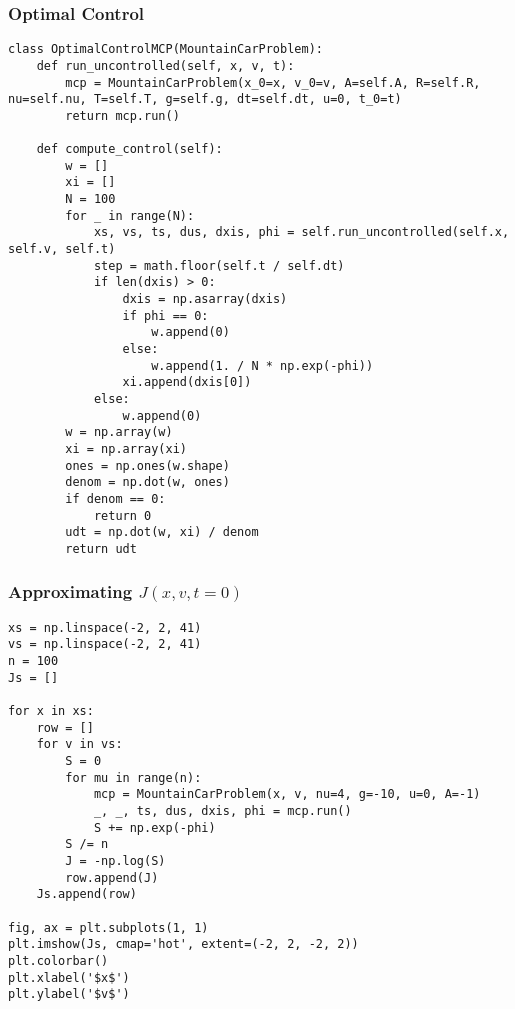 \documentclass[10pt,a4paper]{article}
\begin{document}
\subsubsection{Optimal Control}
\begin{lstlisting}
class OptimalControlMCP(MountainCarProblem):
    def run_uncontrolled(self, x, v, t):
        mcp = MountainCarProblem(x_0=x, v_0=v, A=self.A, R=self.R, nu=self.nu, T=self.T, g=self.g, dt=self.dt, u=0, t_0=t)
        return mcp.run()
    
    def compute_control(self):
        w = []
        xi = []
        N = 100
        for _ in range(N):
            xs, vs, ts, dus, dxis, phi = self.run_uncontrolled(self.x, self.v, self.t)
            step = math.floor(self.t / self.dt)
            if len(dxis) > 0:
                dxis = np.asarray(dxis)
                if phi == 0:
                    w.append(0)
                else:
                    w.append(1. / N * np.exp(-phi))
                xi.append(dxis[0])
            else:
                w.append(0)
        w = np.array(w)
        xi = np.array(xi)
        ones = np.ones(w.shape)
        denom = np.dot(w, ones)
        if denom == 0:
            return 0
        udt = np.dot(w, xi) / denom
        return udt
\end{lstlisting}

\subsubsection{Approximating $J(x, v, t=0)$}
\begin{lstlisting}
xs = np.linspace(-2, 2, 41)
vs = np.linspace(-2, 2, 41)
n = 100
Js = []

for x in xs:
    row = []
    for v in vs:
        S = 0
        for mu in range(n):
            mcp = MountainCarProblem(x, v, nu=4, g=-10, u=0, A=-1)
            _, _, ts, dus, dxis, phi = mcp.run()
            S += np.exp(-phi)
        S /= n
        J = -np.log(S)
        row.append(J)
    Js.append(row)

fig, ax = plt.subplots(1, 1)
plt.imshow(Js, cmap='hot', extent=(-2, 2, -2, 2))
plt.colorbar()
plt.xlabel('$x$')
plt.ylabel('$v$')
\end{lstlisting}
\end{document}
